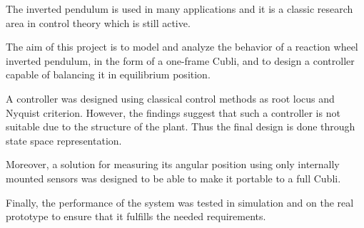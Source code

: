 The inverted pendulum is used in many applications and it is a classic research area in control theory which is still active.

The aim of this project is to model and analyze the behavior of a reaction wheel inverted pendulum, in the form of a one-frame Cubli, and to design a controller capable of balancing it in equilibrium position. 

A controller was designed using classical control methods as root locus and Nyquist criterion. However, the findings suggest that such a controller is not suitable due to the structure of the plant. Thus the final design is done through state space representation.

Moreover, a solution for measuring its angular position using only internally mounted sensors was designed to be able to make it portable to a full Cubli. 

Finally, the performance of the system was tested in simulation and on the real prototype to ensure that it fulfills the needed requirements.